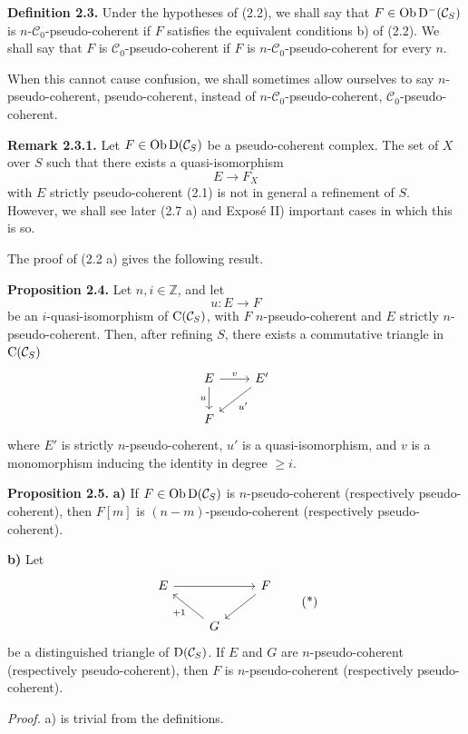\documentclass[11pt]{article}
\begin{document}
\textbf{Definition 2.3.} Under the hypotheses of (2.2), we shall say that \(F\in\operatorname{Ob}\mathrm D^-(\mathcal C_S)\) is \(n\)-\(\mathcal C_0\)-pseudo-coherent if \(F\) satisfies the equivalent conditions b) of (2.2). We shall say that \(F\) is \(\mathcal C_0\)-pseudo-coherent if \(F\) is \(n\)-\(\mathcal C_0\)-pseudo-coherent for every \(n\).

When this cannot cause confusion, we shall sometimes allow ourselves to say \(n\)-pseudo-coherent, pseudo-coherent, instead of \(n\)-\(\mathcal C_0\)-pseudo-coherent, \(\mathcal C_0\)-pseudo-coherent.

\textbf{Remark 2.3.1.} Let \(F\in\operatorname{Ob}\mathrm D(\mathcal C_S)\) be a pseudo-coherent complex. The set of \(X\) over \(S\) such that there exists a quasi-isomorphism
\[
  E\longrightarrow F_X
\]
with \(E\) strictly pseudo-coherent (2.1) is not in general a refinement of \(S\). However, we shall see later (2.7 a) and Exposé II) important cases in which this is so.

The proof of (2.2 a) gives the following result.

\textbf{Proposition 2.4.} Let \(n,i\in\mathbb Z\), and let
\[
  u:E\longrightarrow F
\]
be an \(i\)-quasi-isomorphism of \(\mathrm C(\mathcal C_S)\), with \(F\) \(n\)-pseudo-coherent and \(E\) strictly \(n\)-pseudo-coherent. Then, after refining \(S\), there exists a commutative triangle in \(\mathrm C(\mathcal C_S)\)
\[
\begin{tikzcd}
E \arrow[r,"v"] \arrow[d,"u"'] & E' \arrow[dl,"u'"]\\
F &
\end{tikzcd}
\]
where \(E'\) is strictly \(n\)-pseudo-coherent, \(u'\) is a quasi-isomorphism, and \(v\) is a monomorphism inducing the identity in degree \(\geq i\).

\textbf{Proposition 2.5.} \textbf{a)} If \(F\in\operatorname{Ob}\mathrm D(\mathcal C_S)\) is \(n\)-pseudo-coherent (respectively pseudo-coherent), then \(F[m]\) is \((n-m)\)-pseudo-coherent (respectively pseudo-coherent).

\textbf{b)} Let
\[
\begin{tikzcd}
E \arrow[rr] && F \arrow[dl]\\
& G \arrow[ul,"+1"] &
\end{tikzcd}
\tag{*}
\]
be a distinguished triangle of \(\mathrm D(\mathcal C_S)\). If \(E\) and \(G\) are \(n\)-pseudo-coherent (respectively pseudo-coherent), then \(F\) is \(n\)-pseudo-coherent (respectively pseudo-coherent).

\emph{Proof.} a) is trivial from the definitions.
\end{document}
